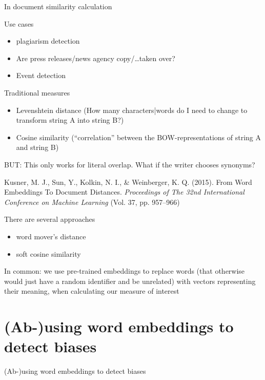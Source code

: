 \documentclass{beamer}
\begin{document}
\begin{frame}{In document similarity calculation}
\begin{block}{Use cases}
	\begin{itemize}
	\item plagiarism detection
	\item Are press releases/news agency copy/\ldots taken over?
	\item Event detection
	\end{itemize}
\end{block}
\pause
\begin{block}{Traditional measures}
	\begin{itemize}
		\item Levenshtein distance (How many characters|words do I need to change to transform string A into string B?)
		\item Cosine similarity (``correlation'' between the BOW-representations of string A and string B)
	\end{itemize}
\end{block}
\end{frame}


\begin{frame}[plain]
BUT: This only works for literal overlap. What if the writer chooses synonyms?
\pause 



\tiny{Kusner, M. J., Sun, Y., Kolkin, N. I., \& Weinberger, K. Q. (2015). From Word Embeddings To Document Distances. \textit{Proceedings of The 32nd International Conference on Machine Learning} (Vol. 37, pp. 957–966)}
\end{frame}


\begin{frame}{There are several approaches}
\begin{itemize}
	\item word mover's distance
	\item soft cosine similarity
\end{itemize}
In common: we use pre-trained embeddings to replace words (that otherwise would just have a random identifier and be unrelated) with vectors representing their meaning, when calculating our measure of interest
\end{frame}


\section[Detecting biases]{(Ab-)using word embeddings to detect biases}
\begin{frame}[plain]
(Ab-)using word embeddings to detect biases
\end{frame}
\end{document}
